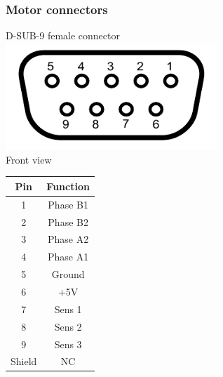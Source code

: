 \documentclass[a4paper, final, 12pt, oneside]{scrartcl}
\numberwithin{equation}{section}
\numberwithin{table}{section}
\numberwithin{figure}{section}
\begin{document}
\subsubsection*{Motor connectors}
\begin{minipage}{\textwidth}
  \begin{minipage}[b]{0.49\textwidth}
    \centering
    D-SUB-9 female connector\\
    \includegraphics[width=0.6\textwidth]{./drawings/Numbered_DE9_female_Diagram.pdf}\\
    Front view
  \end{minipage}
  \hfill
  \begin{minipage}[b]{0.49\textwidth}
    \centering
    \begin{tabular}{cc}
      \toprule
      \textbf{Pin} & \textbf{Function} \\
      \toprule
      1 & Phase B1 \\ \midrule
      2 & Phase B2\\ \midrule
      3 & Phase A2 \\ \midrule
      4 & Phase A1 \\ \midrule
      5 & Ground \\ \midrule
      6 & +5V \\ \midrule
      7 & Sens 1 \\ \midrule
      8 & Sens 2 \\ \midrule
      9 & Sens 3 \\ \midrule
      Shield & NC \\
      \bottomrule
    \end{tabular}
  \end{minipage}
\end{minipage}
\FloatBarrier
\end{document}
